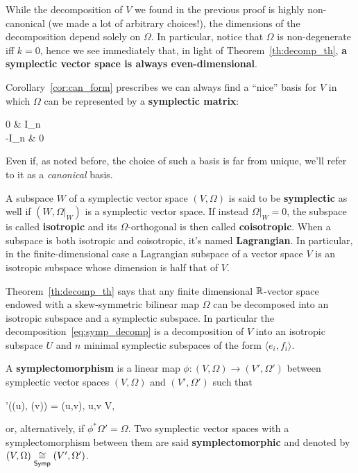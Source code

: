 \documentclass[main.tex]{subfiles}
\begin{document}
\begin{remark}
	While the decomposition of $V$ we found in the previous proof is highly non-canonical (we made a lot of arbitrary choices!), the dimensions of the decomposition depend solely on $\Omega$. In particular, notice that $\Omega$ is non-degenerate iff $k=0$, hence we see immediately that, in light of Theorem~\ref{th:decomp_th}, \textbf{a symplectic vector space is always even-dimensional}.
\end{remark}

Corollary~\ref{cor:can_form} prescribes we can always find a ``nice'' basis for $V$ in which $\Omega$ can be represented by a \textbf{symplectic matrix}:
\begin{eqalign}
	\begin{pmatrix}
		0 & I_n\\
		-I_n & 0
	\end{pmatrix}
\end{eqalign}
Even if, as noted before, the choice of such a basis is far from unique, we'll refer to it as a \emph{canonical} basis.

\begin{definition}
	A subspace $W$ of a symplectic vector space $(V, \Omega)$ is said to be \textbf{symplectic} as well if $(W, \Omega\vert_W)$ is a symplectic vector space. If instead $\Omega\vert_W = 0$, the subspace is called \textbf{isotropic} and its $\Omega$-orthogonal is then called \textbf{coisotropic}. When a subspace is both isotropic and coisotropic, it's named \textbf{Lagrangian}. In particular, in the finite-dimensional case a Lagrangian subspace of a vector space $V$ is an isotropic subspace whose dimension is half that of $V$.
\end{definition}

Theorem~\ref{th:decomp_th} says that any finite dimensional $\mathbb{R}$-vector space endowed with a skew-symmetric bilinear map $\Omega$ can be decomposed into an isotropic subspace and a symplectic subspace. In particular the decomposition~\eqref{eq:symp_decomp} is a decomposition of $V$ into an isotropic subspace $U$ and $n$ minimal symplectic subspaces of the form $\langle e_i, f_i \rangle$. 

\begin{definition}
	A \textbf{symplectomorphism} is a linear map $\phi : (V, \Omega) \to (V', \Omega')$ between symplectic vector spaces $(V, \Omega)$ and $(V', \Omega')$ such that
	\begin{eqalign}
		\Omega'(\phi(u), \phi(v)) = \Omega(u,v), \quad \forall u,v \in V,
	\end{eqalign}
	or, alternatively, if $\phi^* \Omega' = \Omega$. Two symplectic vector spaces with a symplectomorphism between them are said \textbf{symplectomorphic} and denoted by $(V, \Omega) \underset{\cat{Symp}}\iso (V', \Omega')$.
\end{definition}
\end{document}
